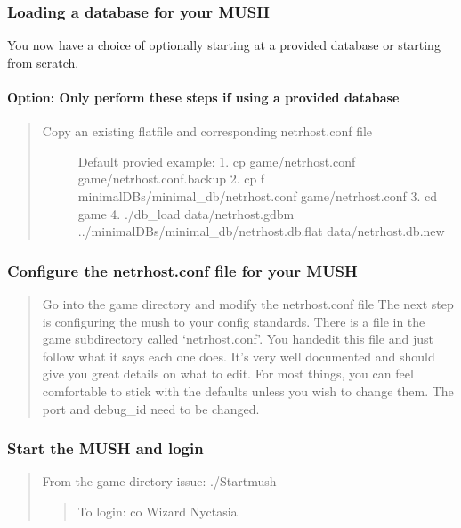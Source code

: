 \documentclass[letterpaper,10pt,english]{sphinxmanual}
\begin{document}
\subsubsection{Loading a database for your MUSH}
\label{\detokenize{installation:loading-a-database-for-your-mush}}
\sphinxAtStartPar
You now have a choice of optionally starting at a provided database or starting from scratch.


\paragraph{Option: Only perform these steps if using a provided database}
\label{\detokenize{installation:option-only-perform-these-steps-if-using-a-provided-database}}\begin{quote}
\begin{description}
\item[{Copy an existing flatfile and corresponding netrhost.conf file}] \leavevmode
\sphinxAtStartPar
Default provied example:
1.  cp game/netrhost.conf game/netrhost.conf.backup
2.  cp \sphinxhyphen{}f minimal\sphinxhyphen{}DBs/minimal\_db/netrhost.conf game/netrhost.conf
3.  cd game
4.  ./db\_load data/netrhost.gdbm ../minimal\sphinxhyphen{}DBs/minimal\_db/netrhost.db.flat data/netrhost.db.new

\end{description}
\end{quote}


\subsubsection{Configure the netrhost.conf file for your MUSH}
\label{\detokenize{installation:configure-the-netrhost-conf-file-for-your-mush}}\begin{quote}

\sphinxAtStartPar
Go into the game directory and modify the netrhost.conf file
The next step is configuring the mush to your config standards.
There is a file in the game subdirectory called ‘netrhost.conf’.
You hand\sphinxhyphen{}edit this file and just follow what it says each
one does.  It’s very well documented and should give you
great details on what to edit.  For most things, you can
feel comfortable to stick with the defaults unless you wish
to change them.  The port and debug\_id need to be changed.
\end{quote}


\subsubsection{Start the MUSH and login}
\label{\detokenize{installation:start-the-mush-and-login}}\begin{quote}

\sphinxAtStartPar
From the game diretory issue: ./Startmush
\begin{quote}

\sphinxAtStartPar
To login:  co Wizard Nyctasia
\end{quote}
\end{quote}
\end{document}
